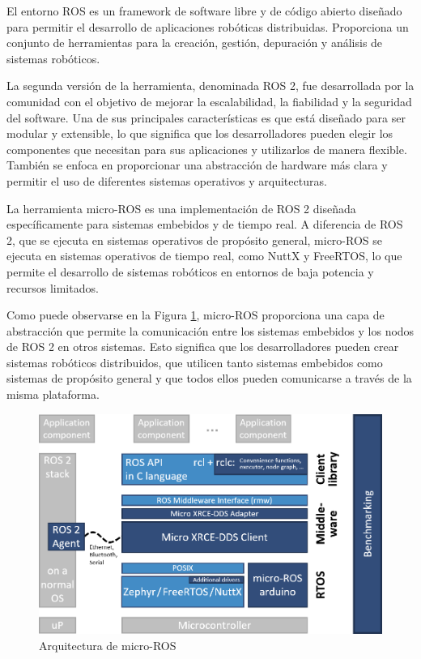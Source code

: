 \documentclass[
11pt, %
codirector, %
]{charter}
\begin{document}
El entorno ROS es un framework de software libre y de código abierto diseñado para permitir el desarrollo de aplicaciones robóticas distribuidas. Proporciona un conjunto de herramientas para la creación, gestión, depuración y análisis de sistemas robóticos.

La segunda versión de la herramienta, denominada ROS 2, fue desarrollada por la comunidad con el objetivo de mejorar la escalabilidad, la fiabilidad y la seguridad del software.
Una de sus principales características es que está diseñado para ser modular y extensible, lo que significa que los desarrolladores pueden elegir los componentes que necesitan para sus aplicaciones y utilizarlos de manera flexible. 
También se enfoca en proporcionar una abstracción de hardware más clara y permitir el uso de diferentes sistemas operativos y arquitecturas. 

La herramienta micro-ROS es una implementación de ROS 2 diseñada específicamente para sistemas embebidos y de tiempo real. A diferencia de ROS 2, que se ejecuta en sistemas operativos de propósito general, micro-ROS se ejecuta en sistemas operativos de tiempo real, como NuttX y FreeRTOS, lo que permite el desarrollo de sistemas robóticos en entornos de baja potencia y recursos limitados.

Como puede observarse en la Figura \ref{fig:microROSarch}, micro-ROS proporciona una capa de abstracción que permite la comunicación entre los sistemas embebidos y los nodos de ROS 2 en otros sistemas.
Esto significa que los desarrolladores pueden crear sistemas robóticos distribuidos, que utilicen tanto sistemas embebidos como sistemas de propósito general y que todos ellos pueden comunicarse a través de la misma plataforma.

\begin{figure}[htpb]
\centering 
\includegraphics[width=.7\textwidth]{./Figuras/micro-ROS_architecture.png}
\caption{Arquitectura de micro-ROS}
\label{fig:microROSarch}
\end{figure}
\end{document}

